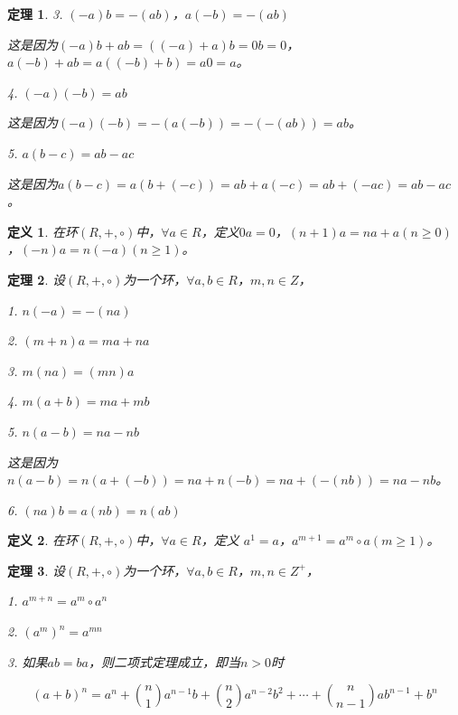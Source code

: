 \documentclass{article}
\newtheorem{Def}{定义}
\newtheorem{Thm}{定理}
\begin{document}
\begin{CJK*}{UTF8}{gbsn}
\begin{Thm}
    3. $(-a)b = -(ab)$，$a(-b)=-(ab)$
  
    这是因为$(-a)b+ab=((-a)+a)b=0b=0$，$a(-b)+ab=a((-b)+b)=a0=a$。
  
  
    4. $(-a)(-b)=ab$
  
    这是因为$(-a)(-b)=-(a(-b))=-(-(ab))=ab$。
  
    5. $a(b-c)=ab-ac$
  
    这是因为$a(b-c)=a(b+(-c))=ab+a(-c)=ab+(-ac)=ab-ac$。
  \end{Thm}
  
  \begin{Def}
    在环$(R,+,\circ)$中，$\forall a\in R$，定义$0a=0$，$(n+1)a=na+a(n\geq 0)$，$(-n)a=n(-a)(n\geq 1)$。
  \end{Def}
  
  \begin{Thm}
    设$(R,+,\circ)$为一个环，$\forall a,b \in R$，$m, n \in Z$，
  
    1. $n(-a)=-(na)$
  
    2. $(m+n)a=ma + na$
  
    3. $m(na)=(mn)a$
  
    4. $m(a+b) = ma + mb$
  
    5. $n(a-b) = na - nb$
  
    这是因为$n(a-b)=n(a+(-b))=na+n(-b)=na+(-(nb))=na-nb$。
  
    6. $(na)b=a(nb)=n(ab)$
  
    
  \end{Thm}
  
  \begin{Def}
    在环$(R,+,\circ)$中，$\forall a\in R$，定义
    $a^1=a$，$a^{m+1}=a^m\circ a(m\geq 1)$。
  \end{Def}
  
  \begin{Thm}
    设$(R,+,\circ)$为一个环，$\forall a,b \in R$，$m, n \in Z^+$，
  
    1. $a^{m+n}=a^m \circ a^n$
  
    2. $(a^{m})^n=a^{mn}$
  
    3. 如果$ab=ba$，则二项式定理成立，即当$n>0$时
  
    \[(a+b)^n=a^n+\binom{n}{1}a^{n-1}b+\binom{n}{2}a^{n-2}b^2+\cdots+\binom{n}{n-1}ab^{n-1}+b^n\]
  \end{Thm}
  

\end{CJK*}
\end{document}
